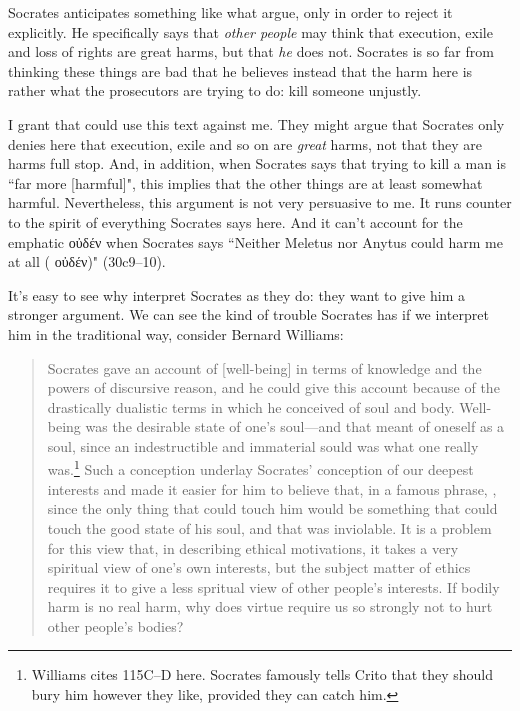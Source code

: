 \documentclass[11pt]{article}
\begin{document}
Socrates anticipates something like what \citeauthor{brickhouse2004} argue,
only in order to reject it explicitly.  He specifically says that \emph{other
people} may think that execution, exile and loss of rights are great harms, but
that \emph{he} does not.  Socrates is so far from thinking these things are bad
that he believes instead that the harm here is rather what the prosecutors are
trying to do: kill someone unjustly.

I grant that \citeauthor{brickhouse2004} could use this text against me.  They
might argue that Socrates only denies here that execution, exile and so on are
\emph{great} harms, not that they are harms full stop.  And, in addition, when
Socrates says that trying to kill a man is ``far more [harmful]", this implies
that the other things are at least somewhat harmful.  Nevertheless, this
argument is not very persuasive to me.  It runs counter to the spirit of
everything Socrates says here. And it can't account for the emphatic {\g οὐδέν}
when Socrates says ``Neither Meletus nor Anytus could harm me at all ({\g
οὐδέν})" (30c9--10).

It's easy to see why \citeauthor{brickhouse2004} interpret Socrates as they do:
they want to give him a stronger argument.  We can see the kind of trouble
Socrates has if we interpret him in the traditional way, consider Bernard
Williams:

\begin{quote}
    Socrates gave an account of [well-being] in terms of knowledge and the
    powers of discursive reason, and he could give this account because of the
    drastically dualistic terms in which he conceived of soul and body.
    Well-being was the desirable state of one's soul---and that meant of
    oneself as a soul, since an indestructible and immaterial sould was what
    one really was.\footnote{Williams cites  115C--D here.
    Socrates famously tells Crito that they should bury him however they like,
    provided they can catch him.}  Such a conception underlay Socrates'
    conception of our deepest interests and made it easier for him to believe
    that, in a famous phrase, , since the
    only thing that could touch him would be something that could touch the
    good state of his soul, and that was inviolable.  It is a problem for this
    view that, in describing ethical motivations, it takes a very spiritual
    view of one's own interests, but the subject matter of ethics requires it
    to give a less spritual view of other people's interests. If bodily harm is
    no real harm, why does virtue require us so strongly not to hurt other
    people's bodies?
    \citep[34]{williams1985}
\end{quote}
\end{document}
